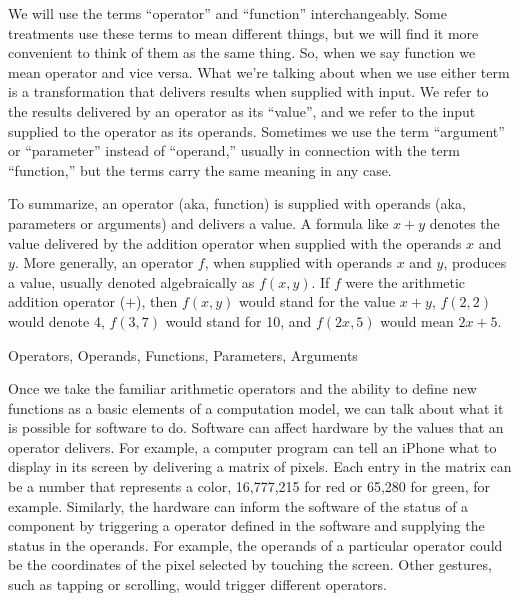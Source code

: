 \begin{aside}
We will use the terms ``operator'' and ``function'' interchangeably.
Some treatments use these terms to mean different things,
but we will find it more convenient to think of them as the same thing.
So, when we say function we mean operator and vice versa.
What we're talking about when we use either term
is a transformation that delivers results when supplied with input.
We refer to the results delivered by an operator as its ``value'',
and we refer to the input supplied to the operator as its operands.
Sometimes we use the term ``argument''
or ``parameter'' instead of ``operand,''
usually in connection with the term ``function,''
but the terms carry the same meaning in any case.

To summarize, an operator (aka, function) is supplied with operands
(aka, parameters or arguments) and delivers a value.
A formula like $x + y$ denotes the value delivered
by the addition operator when supplied with the operands $x$ and $y$.
More generally, an operator $f$, when supplied with operands $x$ and $y$,
produces a value, usually denoted algebraically as $f(x,y)$.
If $f$ were the arithmetic addition operator ($+$),
then $f(x,y)$ would stand for the value $x+y$, $f(2,2)$ would denote 4,
$f(3,7)$ would stand for 10, and $f(2x,5)$ would mean $2x+5$.

\caption{Operators, Operands, Functions, Parameters, Arguments}
\label{operations-and-functions}
\end{aside}

Once we take the familiar arithmetic operators
and the ability to define new functions
as a basic elements of a computation model,
we can talk about what it is possible for software to do.
Software can affect
hardware by the values that an operator delivers.  For example,
a computer program can tell an iPhone what to display
in its screen by delivering a matrix of pixels.
Each entry in the matrix
can be a number that represents a color, 16,777,215 for
red or 65,280 for green, for example.
Similarly, the hardware can inform the
software of the status of a component by triggering a operator
defined in the software and supplying the status in the operands.
For example, the operands of a particular operator could be
the coordinates of the pixel selected by touching the screen.
Other gestures, such as tapping or
scrolling, would trigger different operators.

